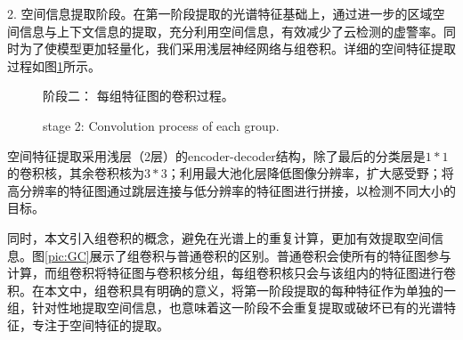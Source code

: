 \documentclass[10pt,UTF8,fntef]{ctexart}
\begin{document}
\begin{multicols}{2}
2. 空间信息提取阶段。在第一阶段提取的光谱特征基础上，通过进一步的区域空间信息与上下文信息的提取，充分利用空间信息，有效减少了云检测的虚警率。同时为了使模型更加轻量化，我们采用浅层神经网络与组卷积。详细的空间特征提取过程如图\ref{pic:part2}所示。
\begin{figure}[H]
    \centering
    \caption[]{阶段二： 每组特征图的卷积过程。}
    \addtocounter{figure}{-1}
    \vspace{-5pt}
    \renewcommand{\figurename}{Fig}
    \caption{stage 2: Convolution process of each group.}
    \renewcommand{\figurename}{图}
    \label{pic:part2}
\end{figure}

空间特征提取采用浅层（2层）的encoder-decoder结构，除了最后的分类层是$1*1$的卷积核，其余卷积核为$3*3$；利用最大池化层降低图像分辨率，扩大感受野；将高分辨率的特征图通过跳层连接与低分辨率的特征图进行拼接，以检测不同大小的目标。

同时，本文引入组卷积的概念，避免在光谱上的重复计算，更加有效提取空间信息。图\ref{pic:GC}展示了组卷积与普通卷积的区别。普通卷积会使所有的特征图参与计算，而组卷积将特征图与卷积核分组，每组卷积核只会与该组内的特征图进行卷积。在本文中，组卷积具有明确的意义，将第一阶段提取的每种特征作为单独的一组，针对性地提取空间信息，也意味着这一阶段不会重复提取或破坏已有的光谱特征，专注于空间特征的提取。


\end{multicols}
\end{document}
